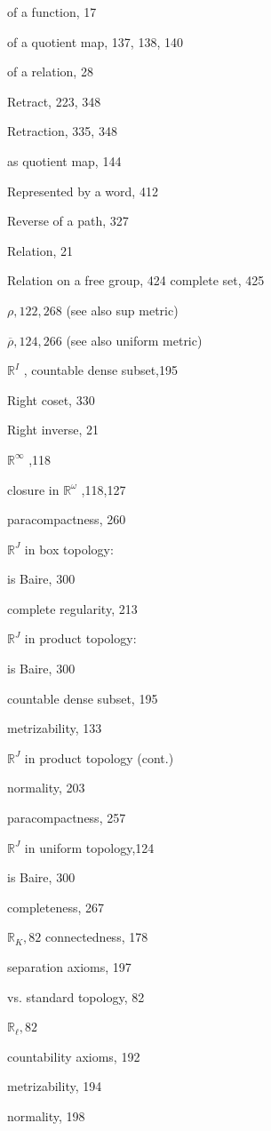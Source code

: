 of a function, 17

of a quotient map, 137, 138, 140

of a relation, 28

Retract, 223, 348

Retraction, 335, 348

as quotient map, 144

Represented by a word, 412

Reverse of a path, 327

Relation, 21

Relation on a free group, 424 complete set, 425

\(\rho ,{122},{268}\) (see also sup metric)

\(\overline{\rho },{124},{266}\) (see also uniform metric)

\({\mathbb{R}}^{I}\) , countable dense subset,195

Right coset, 330

Right inverse, 21

\({\mathbb{R}}^{\infty }\) ,118

closure in \({\mathbb{R}}^{\omega }\) ,118,127

paracompactness, 260

\({\mathbb{R}}^{J}\) in box topology:

is Baire, 300

complete regularity, 213

\({\mathbb{R}}^{J}\) in product topology:

is Baire, 300

countable dense subset, 195

metrizability, 133

\({\mathbb{R}}^{J}\) in product topology (cont.)

normality, 203

paracompactness, 257

\({\mathbb{R}}^{J}\) in uniform topology,124

is Baire, 300

completeness, 267

\({\mathbb{R}}_{K},{82}\) connectedness, 178

separation axioms, 197

vs. standard topology, 82

\({\mathbb{R}}_{\ell },{82}\)

countability axioms, 192

metrizability, 194

normality, 198

